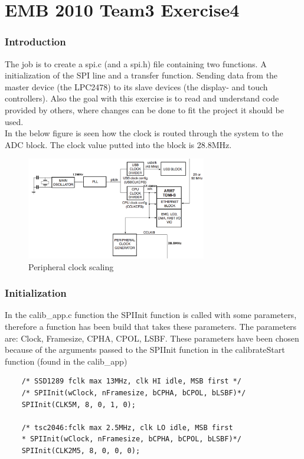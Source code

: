 

\part*{EMB 2010 Team3 Exercise4}
\section{Introduction}
The job is to create a spi.c (and a spi.h) file containing two functions. A initialization of the SPI line and a transfer function.
Sending data from the master device (the LPC2478) to its slave devices (the display- and touch controllers). 
Also the goal with this exercise is to read and understand code provided by others, where changes can be done to
fit the project it should be used.
\\ \newline
In the below figure is seen how the clock is routed through the system to the ADC block. The clock value putted into the block is 28.8MHz.
\begin{figure}[h!]
   \centering
   \includegraphics[width=0.7\textwidth]{peripheral_clock_gen.png}
   \caption{Peripheral clock scaling}
   \label{fig:example}
\end{figure}
\section{Initialization}

In the calib\_app.c function the SPIInit function is called with some parameters, therefore a function has been build that takes these parameters. 
The parameters are: Clock, Framesize, CPHA, CPOL, LSBF. These parameters have been chosen because of the arguments passed to the 
SPIInit function in the calibrateStart function (found in the calib\_app)
\begin{lstlisting}
	/* SSD1289 fclk max 13MHz, clk HI idle, MSB first */
	/* SPIInit(wClock, nFramesize, bCPHA, bCPOL, bLSBF)*/
	SPIInit(CLK5M, 8, 0, 1, 0);
	
	/* tsc2046:fclk max 2.5MHz, clk LO idle, MSB first
	* SPIInit(wClock, nFramesize, bCPHA, bCPOL, bLSBF)*/
	SPIInit(CLK2M5, 8, 0, 0, 0);
\end{lstlisting}

